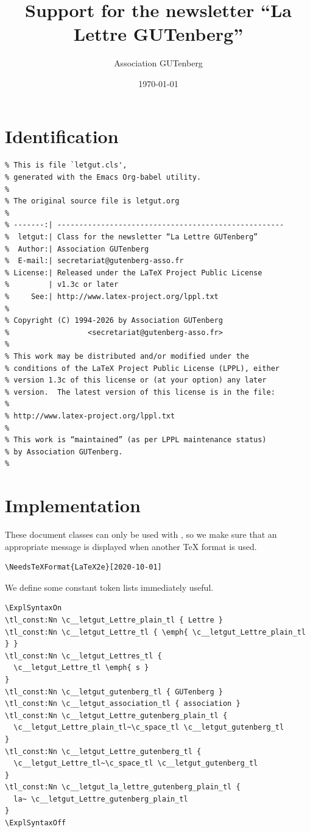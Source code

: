 \documentclass{letgut}
\author{Association GUTenberg}
\date{\today}
\title{Support for the newsletter “La Lettre GUTenberg”}
\begin{document}
\section{Identification}
\label{Identification-mn5g55h0jlj0}
\begin{lstlisting}
% This is file `letgut.cls',
% generated with the Emacs Org-babel utility.
%
% The original source file is letgut.org
%
% -------:| ----------------------------------------------------
%  letgut:| Class for the newsletter “La Lettre GUTenberg”
%  Author:| Association GUTenberg
%  E-mail:| secretariat@gutenberg-asso.fr
% License:| Released under the LaTeX Project Public License
%         | v1.3c or later
%     See:| http://www.latex-project.org/lppl.txt
%
% Copyright (C) 1994-2026 by Association GUTenberg
%                  <secretariat@gutenberg-asso.fr>
%
% This work may be distributed and/or modified under the
% conditions of the LaTeX Project Public License (LPPL), either
% version 1.3c of this license or (at your option) any later
% version.  The latest version of this license is in the file:
%
% http://www.latex-project.org/lppl.txt
%
% This work is “maintained” (as per LPPL maintenance status)
% by Association GUTenberg.
%
\end{lstlisting}
\section{Implementation}
\label{Implementation-vy6g55h0jlj0}
These document classes can only be used with \LaTeXe, so we make
sure that an appropriate message is displayed when another \TeX{}
format is used.

\begin{lstlisting}
\NeedsTeXFormat{LaTeX2e}[2020-10-01]
\end{lstlisting}

We define some constant token lists immediately useful.

\begin{lstlisting}
\ExplSyntaxOn
\tl_const:Nn \c__letgut_Lettre_plain_tl { Lettre }
\tl_const:Nn \c__letgut_Lettre_tl { \emph{ \c__letgut_Lettre_plain_tl } }
\tl_const:Nn \c__letgut_Lettres_tl {
  \c__letgut_Lettre_tl \emph{ s }
}
\tl_const:Nn \c__letgut_gutenberg_tl { GUTenberg }
\tl_const:Nn \c__letgut_association_tl { association }
\tl_const:Nn \c__letgut_Lettre_gutenberg_plain_tl {
  \c__letgut_Lettre_plain_tl~\c_space_tl \c__letgut_gutenberg_tl
}
\tl_const:Nn \c__letgut_Lettre_gutenberg_tl {
  \c__letgut_Lettre_tl~\c_space_tl \c__letgut_gutenberg_tl
}
\tl_const:Nn \c__letgut_la_lettre_gutenberg_plain_tl {
  la~ \c__letgut_Lettre_gutenberg_plain_tl
}
\ExplSyntaxOff
\end{lstlisting}
\end{document}
